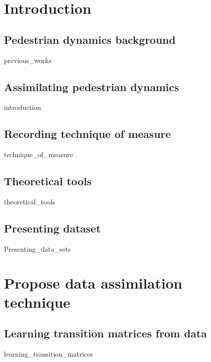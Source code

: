 \documentclass[10pt,a4paper]{report}
\begin{document}

\begin{abstract}
	{abstract}
\end{abstract}



\tableofcontents



\chapter{Introduction}

\FloatBarrier
\section{Pedestrian dynamics background}
	{previous_works}

\FloatBarrier
\section{Assimilating pedestrian dynamics}
	{introduction}

\FloatBarrier
\section{Recording technique of measure}
	{technique_of_measure}

\FloatBarrier
\section{Theoretical tools}
	{theoretical_tools}

\FloatBarrier
\section{Presenting dataset}
	{Presenting_data_sets}



\chapter{Propose data assimilation technique}

\FloatBarrier
\section{Learning transition matrices from data}
	{learning_transition_matrices}
\end{document}
